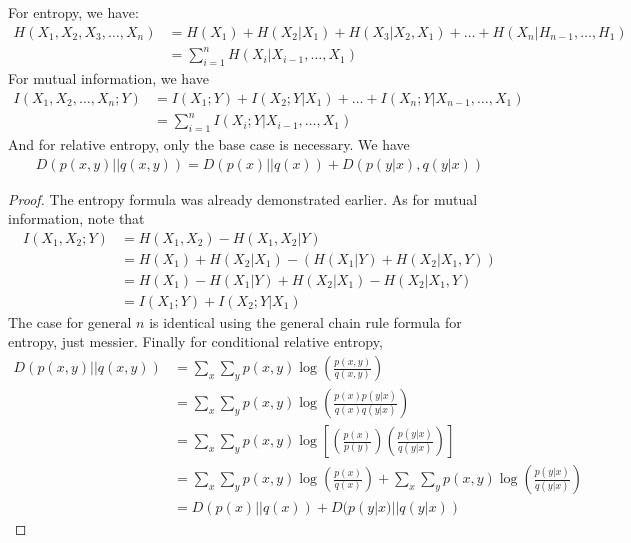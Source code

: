 \begin{theorem}
	For entropy, we have:
\begin{align}
	H(X_1,X_2,X_3,\ldots,X_n) &= H(X_1)+H(X_2|X_1)+H(X_3|X_2,X_1) +\ldots + H(X_n|H_{n-1},\ldots,H_1) \\
	&= \sum_{i=1}^n H(X_i|X_{i-1},\ldots,X_1)
\end{align}
	For mutual information, we have
\begin{align}
	I(X_1,X_2,\ldots,X_n;Y) &= I(X_1;Y)+I(X_2;Y|X_1)+\ldots + I(X_n;Y|X_{n-1},\ldots,X_1) \\
	&= \sum_{i=1}^n I(X_i;Y|X_{i-1},\ldots,X_1)
\end{align}
And for relative entropy, only the base case is necessary. We have
\begin{align}
	D(p(x,y)||q(x,y)) = D(p(x)||q(x))+D(p(y|x),q(y|x))
\end{align}
\end{theorem}
\begin{proof}
	The entropy formula was already demonstrated earlier. As for mutual information, note that
	\begin{align}
		I(X_1,X_2;Y) &= H(X_1,X_2) - H(X_1,X_2|Y) \\
			&= H(X_1)+H(X_2|X_1) - (H(X_1|Y)+H(X_2|X_1,Y)) \\
			&= H(X_1) - H(X_1|Y) + H(X_2|X_1) - H(X_2|X_1,Y) \\
			&= I(X_1;Y) + I(X_2;Y|X_1) 
	\end{align} 
The case for general $n$ is identical using the general chain rule formula for entropy, just messier. Finally for conditional relative entropy, 
\begin{align}
	D(p(x,y)||q(x,y)) &= \sum_x \sum_y p(x,y)\log\left( \frac{p(x,y)}{q(x,y)} \right) \\
	&= \sum_x \sum_y p(x,y)\log\left( \frac{p(x)p(y|x)}{q(x)q(y|x)} \right) \\
	&= \sum_x \sum_y p(x,y)\log\left[ \left( \frac{p(x)}{p(y)} \right) \left( \frac{p(y|x)}{q(y|x)} \right) \right] \\
	&= \sum_x \sum_y p(x,y)\log\left( \frac{p(x)}{q(x)} \right) + \sum_x \sum_y p(x,y) \log\left( \frac{p(y|x)}{q(y|x)} \right) \\
	&= D(p(x)||q(x)) + D(p(y|x)||q(y|x))
\end{align}
\end{proof}

